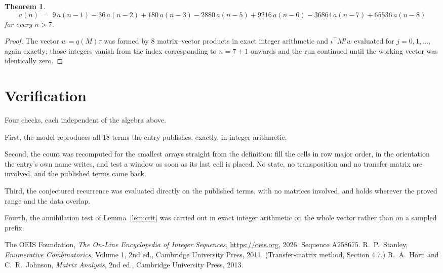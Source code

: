 \documentclass[11pt,a4paper]{article}
\theoremstyle{plain}
\newtheorem{theorem}{Theorem}
\theoremstyle{definition}
\begin{document}
\begin{theorem}
\[
a(n)\;=\;9\,a(n-1) - 36\,a(n-2) + 180\,a(n-3) - 2880\,a(n-5) + 9216\,a(n-6) - 36864\,a(n-7) + 65536\,a(n-8)
\]
for every $n>7$.
\end{theorem}

\begin{proof}
The vector $w=q(M)\tau$ was formed by $8$ matrix--vector products in exact integer
arithmetic and $\iota^{\!\top}M^{j}w$ evaluated for $j=0,1,\dots$, again exactly; those
integers vanish from the index corresponding to $n=7+1$ onwards and the run continued
until the working vector was identically zero.
\end{proof}

\section{Verification}

Four checks, each independent of the algebra above.

First, the model reproduces all $18$ terms the entry publishes, exactly, in integer
arithmetic.

Second, the count was recomputed for the smallest arrays straight from the definition: fill the
cells in row major order, in the orientation the entry's own name writes, and test a window as
soon as its last cell is placed. No state, no transposition and no transfer matrix are
involved, and the published terms came back.

Third, the conjectured recurrence was evaluated directly on the published terms, with no
matrices involved, and holds wherever the proved range and the data overlap.

Fourth, the annihilation test of Lemma~\ref{lem:crit} was carried out in exact integer
arithmetic on the whole vector rather than on a sampled prefix.

\begin{thebibliography}{9}
 The OEIS Foundation, \emph{The On-Line Encyclopedia of Integer
Sequences}, \url{https://oeis.org}, 2026. Sequence A258675.
 R.~P.~Stanley, \emph{Enumerative Combinatorics}, Volume 1, 2nd ed.,
Cambridge University Press, 2011. (Transfer-matrix method, Section 4.7.)
 R.~A.~Horn and C.~R.~Johnson, \emph{Matrix Analysis}, 2nd ed., Cambridge
University Press, 2013.
\end{thebibliography}
\end{document}
